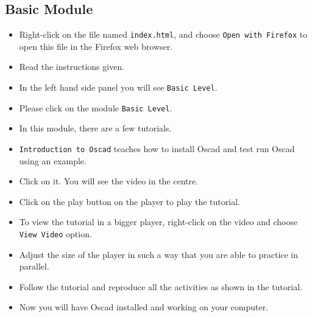   \subsection{Basic Module}
  \begin{itemize}
  \item Right-click on the file named {\tt index.html}, and choose {\tt Open with Firefox} to open this file in the Firefox web browser.
  \item Read the instructions given.
  \item In the left hand side panel you will see {\tt Basic Level}.
  \item Please click on the module {\tt Basic Level}.
\item In this module, there are a few tutorials.
\item {\tt Introduction to Oscad} teaches how to install Oscad and test run Oscad using an example. 
\item Click on it. You will see the video in the centre.
  \item Click on the play button on the player to play the tutorial.
  \item To view the tutorial in a bigger player, right-click on the video and choose {\tt View Video} option. 
  \item Adjust the size of the player in such a way that you are able to practice in parallel.
\item Follow the tutorial and reproduce all the activities as shown in the tutorial.
\item Now you will have Oscad installed and working on your computer.
  \end{itemize}
  
  
  
